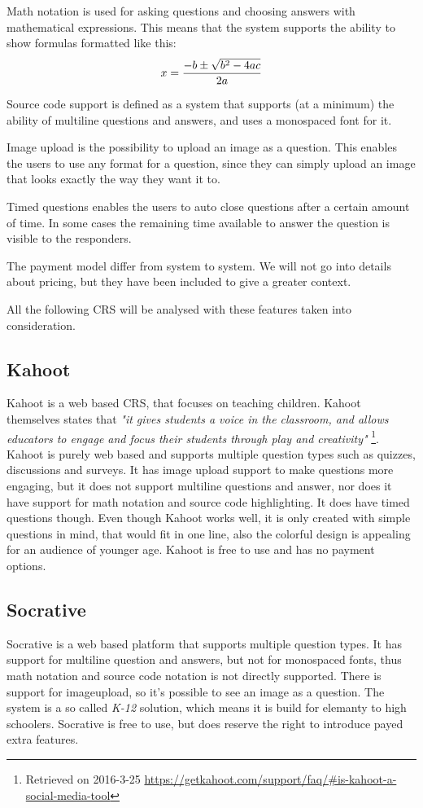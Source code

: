 Math notation is used for asking questions and choosing answers with mathematical expressions. This means that the system supports the ability to show formulas formatted like this: $$x = {-b \pm \sqrt{b^2-4ac} \over 2a}$$

Source code support is defined as a system that supports (at a minimum) the ability of multiline questions and answers, and uses a monospaced font for it. 

Image upload is the possibility to upload an image as a question. This enables the users to use any format for a question, since they can simply upload an image that looks exactly the way they want it to.

Timed questions enables the users to auto close questions after a certain amount of time. In some cases the remaining time available to answer the question is visible to the responders.

The payment model differ from system to system. We will not go into details about pricing, but they have been included to give a greater context.

All the following CRS will be analysed with these features taken into consideration.

\subsection*{Kahoot}
Kahoot is a web based CRS, that focuses on teaching children. Kahoot themselves states that  \emph{"it gives students a voice in the classroom, and allows educators to engage and focus their students through play and creativity"} \footnote{Retrieved on 2016-3-25 \url{https://getkahoot.com/support/faq/\#is-kahoot-a-social-media-tool}}. Kahoot is purely web based and supports multiple question types such as quizzes, discussions and surveys. It has image upload support to make questions more engaging, but it does not support multiline questions and answer, nor does it have support for math notation and source code highlighting. It does have timed questions though. Even though Kahoot works well, it is only created with simple questions in mind, that would fit in one line, also the colorful design is appealing for an audience of younger age. Kahoot is free to use and has no payment options.

\subsection*{Socrative}
Socrative is a web based platform that supports multiple question types. It has support for multiline question and answers, but not for monospaced fonts, thus math notation and source code notation is not directly supported. There is support for imageupload, so it's possible to see an image as a question. The system is a so called \emph{K-12} solution, which means it is build for elemanty to high schoolers. Socrative is free to use, but does reserve the right to introduce payed extra features.

